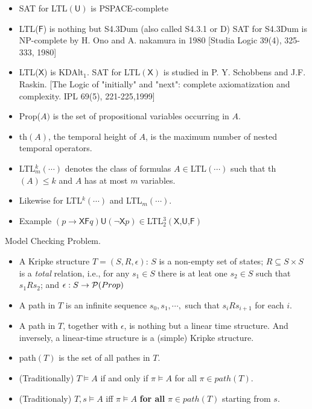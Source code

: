 \documentclass[12pt]{article}
\begin{document}
\begin{CJK*}{GBK}{song}
\begin{itemize}
\item SAT for LTL$(\textsf{U})$ is PSPACE-complete

\item LTL($\textsf{F}$) is nothing but S4.3Dum (also called S4.3.1 or D)
SAT for S4.3Dum is NP-complete by H. Ono and A. nakamura in 1980 [Studia Logic 39(4), 325-333, 1980]

\item LTL($\textsf{X}$) is KDAlt$_1$. SAT for LTL$(\textsf{X})$ is studied in  P. Y. Schobbens and J.F. Raskin. [The Logic of "initially" and "next": complete axiomatization and complexity. IPL 69(5), 221-225,1999]
\end{itemize}

\begin{itemize}
\item Prop($A)$ is the set of propositional variables occurring in $A$.

\item th$(A)$, the temporal height of $A$, is the maximum number of nested temporal operators.

\item LTL$^k_m(\cdots)$ denotes the class of  formulas $A\in$LTL$(\cdots)$ such that th$(A)\leq k$ and $A$ has at most $m$ variables.
\item Likewise for LTL$^k(\cdots)$ and LTL$_m(\cdots)$.
\item Example $(p\rightarrow \textsf{XF}q)\textsf{U}(\neg\textsf{X}p)\in$LTL$_2^3(\textsf{X,U,F})$
\end{itemize}


Model Checking Problem.

\begin{itemize}
\item A Kripke structure $T=(S, R,\epsilon)$: $S$ is a non-empty set of states; $R\subseteq S\times S$ is a {\em total} relation, i.e., for any $s_1\in S$ there is at leat one $s_2\in S$ such that $s_1Rs_2$; and $\epsilon: S\rightarrow {\cal P}(Prop)$
\item A path in $T$ is an infinite sequence $s_0, s_1,\cdots,$ such that $s_iRs_{i+1}$ for each $i$.

\item A path in $T$, together with $\epsilon$, is nothing but a linear time structure. And inversely, a linear-time structure is a (simple) Kripke structure.

\item path$(T)$ is the set of all pathes in $T$.

\item (Traditionally) $T\models A$ if and only if $\pi\models A$ for all $\pi\in path(T)$.
\item (Traditionaly) $T,s\models A$ iff $\pi\models A$ {\bf for all} $\pi\in path(T)$ starting from $s$.


\end{itemize}
\end{CJK*}
\end{document}
